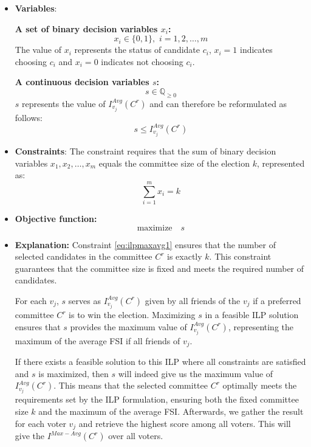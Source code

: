 \documentclass{article}
\begin{document}
\begin{itemize}
  \item \textbf{Variables}: 

\textbf{A set of binary decision variables $x_i$:} \[  x_i \in \{0, 1\} , \,\, i=1,2,\dots, m \] The value of $x_i$ represents the status of candidate $c_i$, \(x_i = 1\) indicates choosing $c_i$ and \(x_i = 0\) indicates not choosing $c_i$.


\textbf{A continuous decision variables $s$:} 
\[  s\in \mathbb{Q}_{\geq 0} \] 
$s$ represents the value of $I_{v_j}^{Avg}(C^{r})$ and can therefore be reformulated as follows:
\[ s \leq I_{v_j}^{Avg}(C^{r})\]
    \item \textbf{Constraints}:
The constraint requires that the sum of binary decision variables \(x_1, x_2, \ldots, x_m\) equals the committee size of the election \(k\), represented as:
\begin{equation} \sum_{i=1}^m x_i = k     \label{eq:ilpmaxavg1}
\end{equation}
  
  \item  \textbf{Objective function:}
  \[\text{maximize} \quad s\]

  \item  \textbf{Explanation:}
Constraint \ref{eq:ilpmaxavg1} ensures that the number of selected candidates in the committee \(C^r\) is exactly \(k\). This constraint guarantees that the committee size is fixed and meets the required number of candidates.

For each $v_j$, \(s\) serves as $I_{v_j}^{Avg}(C^{r})$ given by all friends of the $v_j$ if a preferred committee \(C^r\) is to win the election. Maximizing \(s\) in a feasible ILP solution ensures that \(s\) provides the maximum value of \(I_{v_j}^{Avg}(C^{r})\), representing the maximum of the average FSI if all friends of $v_j$. 

If there exists a feasible solution to this ILP where all constraints are satisfied and \(s\) is maximized, then \(s\) will indeed give us the maximum value of  \(I_{v_j}^{Avg}(C^{r})\). This means that the selected committee \(C^r\) optimally meets the requirements set by the ILP formulation, ensuring both the fixed committee size \(k\) and the maximum of the average FSI. Afterwards, we gather the result for each voter $v_j$ and retrieve the highest score among all voters. This will give the $I^{Max-Avg}(C^{r})$ over all voters.

\end{itemize}
\end{document}
